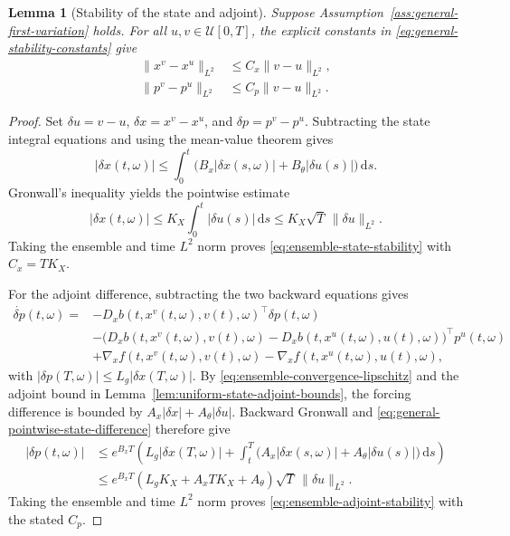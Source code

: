 \documentclass[11pt]{amsart}
\numberwithin{equation}{section} %
\newcommand{\dd}{\mathrm{d}}
\newtheorem{lemma}{Lemma}[section]
\theoremstyle{remark}
\begin{document}
\begin{lemma}[Stability of the state and adjoint]
\label{lem:ensemble-state-adjoint-stability}
Suppose Assumption~\ref{ass:general-first-variation} holds. For all
$u,v\in\mathcal U[0,T]$, the explicit constants in
\eqref{eq:general-stability-constants} give
\begin{align}
\label{eq:ensemble-state-stability}
\|x^v-x^u\|_{L^2}&\le C_x\|v-u\|_{L^2},\\
\label{eq:ensemble-adjoint-stability}
\|p^v-p^u\|_{L^2}&\le C_p\|v-u\|_{L^2}.
\end{align}
\end{lemma}

\begin{proof}
Set $\delta u=v-u$, $\delta x=x^v-x^u$, and $\delta p=p^v-p^u$.
Subtracting the state integral equations and using the mean-value
theorem gives
\[
|\delta x(t,\omega)|\le\int_0^t
\bigl(B_x|\delta x(s,\omega)|+B_\theta|\delta u(s)|\bigr)\,\dd s.
\]
Gronwall's inequality yields the pointwise estimate
\begin{equation}
\label{eq:general-pointwise-state-difference}
|\delta x(t,\omega)|\le K_X\int_0^t|\delta u(s)|\,\dd s
\le K_X\sqrt T\,\|\delta u\|_{L^2}.
\end{equation}
Taking the ensemble and time $L^2$ norm proves
\eqref{eq:ensemble-state-stability} with $C_x=TK_X$.

For the adjoint difference, subtracting the two backward equations gives
\begin{align*}
\dot{\delta p}(t,\omega)={}&
-D_x b(t,x^v(t,\omega),v(t),\omega)^\top\delta p(t,\omega)\\
&-\bigl(D_x b(t,x^v(t,\omega),v(t),\omega)
-D_x b(t,x^u(t,\omega),u(t),\omega)\bigr)^\top p^u(t,\omega)\\
&+\nabla_x f(t,x^v(t,\omega),v(t),\omega)
-\nabla_x f(t,x^u(t,\omega),u(t),\omega),
\end{align*}
with $|\delta p(T,\omega)|\le L_g|\delta x(T,\omega)|$.
By \eqref{eq:ensemble-convergence-lipschitz} and the adjoint bound in
Lemma~\ref{lem:uniform-state-adjoint-bounds}, the forcing difference
is bounded by $A_x|\delta x|+A_\theta|\delta u|$.
Backward Gronwall and \eqref{eq:general-pointwise-state-difference}
therefore give
\begin{align*}
|\delta p(t,\omega)|
&\le e^{B_xT}\left(L_g|\delta x(T,\omega)|
+\int_t^T\bigl(A_x|\delta x(s,\omega)|+A_\theta|\delta u(s)|\bigr)\,\dd s\right)\\
&\le e^{B_xT}(L_gK_X+A_xTK_X+A_\theta)
\sqrt T\,\|\delta u\|_{L^2}.
\end{align*}
Taking the ensemble and time $L^2$ norm proves
\eqref{eq:ensemble-adjoint-stability} with the stated $C_p$.
\end{proof}
\end{document}
